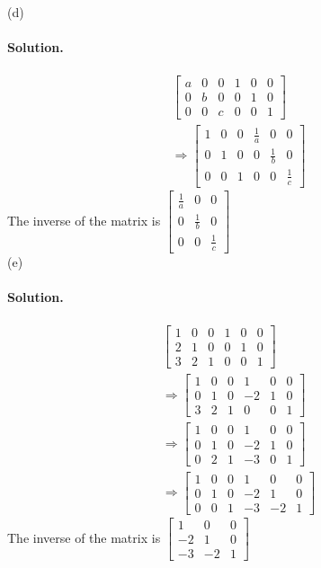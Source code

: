 (d)
\paragraph*{Solution.}
\begin{align*}
    &\left[\begin{array}{ccc|ccc}
        a&0&0&1&0&0\\
        0&b&0&0&1&0\\
        0&0&c&0&0&1
    \end{array}\right]\\
    &\Rightarrow\left[\begin{array}{ccc|ccc}
        1&0&0&\frac{1}{a}&0&0\\
        0&1&0&0&\frac{1}{b}&0\\
        0&0&1&0&0&\frac{1}{c}
    \end{array}\right]
\end{align*}
The inverse of the matrix is $\begin{bmatrix}
    \frac{1}{a}&0&0\\
    0&\frac{1}{b}&0\\
    0&0&\frac{1}{c}
\end{bmatrix}$\\

(e)
\paragraph*{Solution.}
\begin{align*}
    &\left[\begin{array}{ccc|ccc}
        1&0&0&1&0&0\\
        2&1&0&0&1&0\\
        3&2&1&0&0&1
    \end{array}\right]\\
    &\Rightarrow\left[\begin{array}{ccc|ccc}
        1&0&0&1&0&0\\
        0&1&0&-2&1&0\\
        3&2&1&0&0&1
    \end{array}\right]\\
    &\Rightarrow\left[\begin{array}{ccc|ccc}
        1&0&0&1&0&0\\
        0&1&0&-2&1&0\\
        0&2&1&-3&0&1
    \end{array}\right]\\
    &\Rightarrow\left[\begin{array}{ccc|ccc}
        1&0&0&1&0&0\\
        0&1&0&-2&1&0\\
        0&0&1&-3&-2&1
    \end{array}\right]
\end{align*}
The inverse of the matrix is $\begin{bmatrix}
    1&0&0\\-2&1&0\\-3&-2&1
\end{bmatrix}$
\newpage
